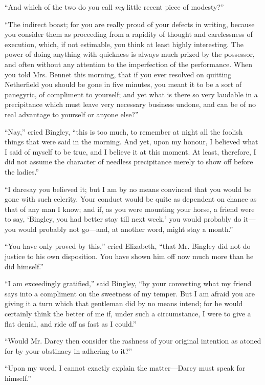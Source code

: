 \documentclass[12pt]{book}
\begin{document}
``And which of the two do you call \textit{my} little recent piece of modesty?''

``The indirect boast; for you are really proud of your defects in writing, because you consider them as proceeding from a rapidity of thought and carelessness of execution, which, if not estimable, you think at least highly interesting. The power of doing anything with quickness is always much prized by the possessor, and often without any attention to the imperfection of the performance. When you told Mrs. Bennet this morning, that if you ever resolved on quitting Netherfield you should be gone in five minutes, you meant it to be a sort of panegyric, of compliment to yourself; and yet what is there so very laudable in a precipitance which must leave very necessary business undone, and can be of no real advantage to yourself or anyone else?''

``Nay,'' cried Bingley, ``this is too much, to remember at night all the foolish things that were said in the morning. And yet, upon my honour, I believed what I said of myself to be true, and I believe it at this moment. At least, therefore, I did not assume the character of needless precipitance merely to show off before the ladies.''

``I daresay you believed it; but I am by no means convinced that you would be gone with such celerity. Your conduct would be quite as dependent on chance as that of any man I know; and if, as you were mounting your horse, a friend were to say, `Bingley, you had better stay till next week,' you would probably do it---you would probably not go---and, at another word, might stay a month.''

``You have only proved by this,'' cried Elizabeth, ``that Mr. Bingley did not do justice to his own disposition. You have shown him off now much more than he did himself.''

``I am exceedingly gratified,'' said Bingley, ``by your converting what my friend says into a compliment on the sweetness of my temper. But I am afraid you are giving it a turn which that gentleman did by no means intend; for he would certainly think the better of me if, under such a circumstance, I were to give a flat denial, and ride off as fast as I could.''

``Would Mr. Darcy then consider the rashness of your original intention as atoned for by your obstinacy in adhering to it?''

``Upon my word, I cannot exactly explain the matter---Darcy must speak for himself.''
\end{document}
